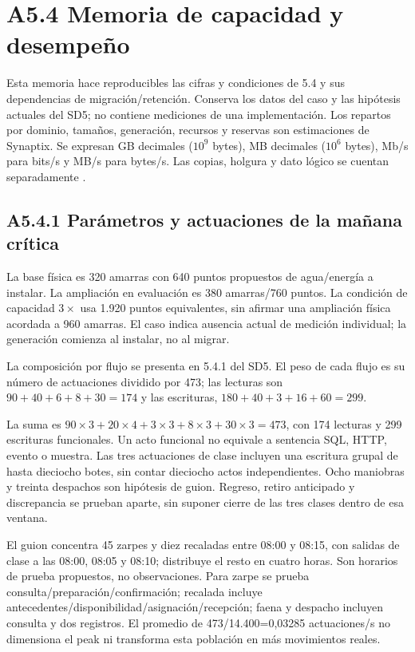 \section*{A5.4 Memoria de capacidad y desempeño}

\label{anx:sd5_capacidad_desempeno}

Esta memoria hace reproducibles las cifras y condiciones de 5.4 y sus dependencias de migración/retención. Conserva los datos del caso y las hipótesis actuales del SD5; no contiene mediciones de una implementación. Los repartos por dominio, tamaños, generación, recursos y reservas son estimaciones de Synaptix. Se expresan GB decimales (\(10^9\) bytes), MB decimales (\(10^6\) bytes), Mb/s para bits/s y MB/s para bytes/s. Las copias, holgura y dato lógico se cuentan separadamente \parencites[sec.~14.1--14.2]{pucv-caso07}[RT-09.01--RT-09.09 y RT-07.13]{pucv-bases-transversales}[sec.~4.2]{synaptix-sd4}.

\subsection*{A5.4.1 Parámetros y actuaciones de la mañana crítica}

La base física es 320 amarras con 640 puntos propuestos de agua/energía a instalar. La ampliación en evaluación es 380 amarras/760 puntos. La condición de capacidad \(3\times\) usa 1.920 puntos equivalentes, sin afirmar una ampliación física acordada a 960 amarras. El caso indica ausencia actual de medición individual; la generación comienza al instalar, no al migrar.


La composición por flujo se presenta en 5.4.1 del SD5. El peso de cada flujo es su número de actuaciones dividido por 473; las lecturas son \(90+40+6+8+30=174\) y las escrituras, \(180+40+3+16+60=299\).


La suma es \(90\times3+20\times4+3\times3+8\times3+30\times3=473\), con 174 lecturas y 299 escrituras funcionales. Un acto funcional no equivale a sentencia SQL, HTTP, evento o muestra. Las tres actuaciones de clase incluyen una escritura grupal de hasta dieciocho botes, sin contar dieciocho actos independientes. Ocho maniobras y treinta despachos son hipótesis de guion. Regreso, retiro anticipado y discrepancia se prueban aparte, sin suponer cierre de las tres clases dentro de esa ventana.

El guion concentra 45 zarpes y diez recaladas entre 08:00 y 08:15, con salidas de clase a las 08:00, 08:05 y 08:10; distribuye el resto en cuatro horas. Son horarios de prueba propuestos, no observaciones. Para zarpe se prueba consulta/preparación/confirmación; recalada incluye antecedentes/disponibilidad/asignación/recepción; faena y despacho incluyen consulta y dos registros. El promedio de 473/14.400=0,03285 actuaciones/s no dimensiona el peak ni transforma esta población en más movimientos reales.

